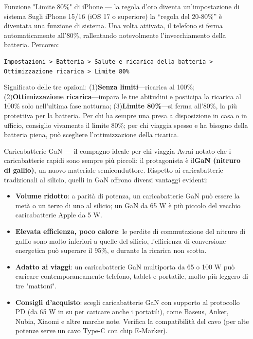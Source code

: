\begin{tcbinfo}{Funzione "Limite 80\%" di iPhone — la regola d'oro diventa un'impostazione di sistema}
Sugli iPhone 15/16 (iOS 17 o superiore) la “regola del 20-80\%” è diventata una funzione di sistema. Una volta attivata, il telefono si ferma automaticamente all'80\%, rallentando notevolmente l'invecchiamento della batteria. Percorso:

\texttt{Impostazioni > Batteria > Salute e ricarica della batteria > Ottimizzazione ricarica > Limite 80\%}

Significato delle tre opzioni: (1)\textbf{Senza limiti}—ricarica al 100\%; (2)\textbf{Ottimizzazione ricarica}—impara le tue abitudini e posticipa la ricarica al 100\% solo nell'ultima fase notturna; (3)\textbf{Limite 80\%}—si ferma all'80\%, la più protettiva per la batteria. Per chi ha sempre una presa a disposizione in casa o in ufficio, consiglio vivamente il limite 80\%; per chi viaggia spesso e ha bisogno della batteria piena, può scegliere l'ottimizzazione della ricarica.

\end{tcbinfo}

\begin{tcbinfo}{Caricabatterie GaN — il compagno ideale per chi viaggia}
Avrai notato che i caricabatterie rapidi sono sempre più piccoli: il protagonista è il\textbf{GaN (nitruro di gallio)}, un nuovo materiale semiconduttore. Rispetto ai caricabatterie tradizionali al silicio, quelli in GaN offrono diversi vantaggi evidenti:

\begin{itemize}
  \item \textbf{Volume ridotto}: a parità di potenza, un caricabatterie GaN può essere la metà o un terzo di uno al silicio; un GaN da 65 W è più piccolo del vecchio caricabatterie Apple da 5 W.
  \item \textbf{Elevata efficienza, poco calore}: le perdite di commutazione del nitruro di gallio sono molto inferiori a quelle del silicio, l'efficienza di conversione energetica può superare il 95\%, e durante la ricarica non scotta.
  \item \textbf{Adatto ai viaggi}: un caricabatterie GaN multiporta da 65 o 100 W può caricare contemporaneamente telefono, tablet e portatile, molto più leggero di tre "mattoni".
  \item \textbf{Consigli d'acquisto}: scegli caricabatterie GaN con supporto al protocollo PD (da 65 W in su per caricare anche i portatili), come Baseus, Anker, Nubia, Xiaomi e altre marche note. Verifica la compatibilità del cavo (per alte potenze serve un cavo Type-C con chip E-Marker).
\end{itemize}

\end{tcbinfo}

